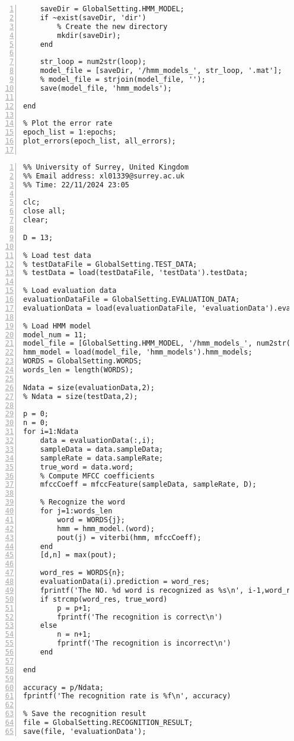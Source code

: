 \documentclass{article}
\begin{document}
\begin{lstlisting}[frame=single, numbers=left, style=Matlab-editor, caption={train\_model.m}, label={lst:train_model}]
    % Save the HMM model
    saveDir = GlobalSetting.HMM_MODEL;
    if ~exist(saveDir, 'dir')
        % Create the new directory
        mkdir(saveDir);
    end

    str_loop = num2str(loop);
    model_file = [saveDir, '/hmm_models_', str_loop, '.mat'];
    % model_file = strjoin(model_file, '');
    save(model_file, 'hmm_models');

end

% Plot the error rate
epoch_list = 1:epochs;
plot_errors(epoch_list, all_errors);


\end{lstlisting}

\begin{lstlisting}[frame=single, numbers=left, style=Matlab-editor, caption={test\_model.m}, label={lst:test_model}]
  %% Author: Xiaoguang Liang (PG/T - Comp Sci & Elec Eng)
%% University of Surrey, United Kingdom
%% Email address: xl01339@surrey.ac.uk
%% Time: 22/11/2024 23:05

clc;
close all;
clear;

D = 13;

% Load test data
% testDataFile = GlobalSetting.TEST_DATA;
% testData = load(testDataFile, 'testData').testData;

% Load evaluation data
evaluationDataFile = GlobalSetting.EVALUATION_DATA;
evaluationData = load(evaluationDataFile, 'evaluationData').evaluationData;

% Load HMM model
model_num = 11;
model_file = [GlobalSetting.HMM_MODEL, '/hmm_models_', num2str(model_num), '.mat'];
hmm_model = load(model_file, 'hmm_models').hmm_models;
WORDS = GlobalSetting.WORDS;
words_len = length(WORDS);

Ndata = size(evaluationData,2);
% Ndata = size(testData,2);

p = 0;
n = 0;
for i=1:Ndata
    data = evaluationData(:,i);
    sampleData = data.sampleData;
    sampleRate = data.sampleRate;
    true_word = data.word;
    % Compute MFCC coefficients
    mfccCoeff = mfccFeature(sampleData, sampleRate, D);

    % Recognize the word
    for j=1:words_len
        word = WORDS{j};
        hmm = hmm_model.(word);
        pout(j) = viterbi(hmm, mfccCoeff);
    end
    [d,n] = max(pout);

    word_res = WORDS{n};
    evaluationData(i).prediction = word_res;
    fprintf('The NO. %d word is recognized as %s\n', i-1,word_res)
    if strcmp(word_res, true_word)
        p = p+1;
        fprintf('The recognition is correct\n')
    else
        n = n+1;
        fprintf('The recognition is incorrect\n')
    end

end

accuracy = p/Ndata;
fprintf('The recognition rate is %f\n', accuracy)

% Save the recognition result
file = GlobalSetting.RECOGNITION_RESULT;
save(file, 'evaluationData');

\end{lstlisting}
\end{document}
